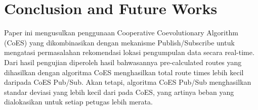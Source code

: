 \documentclass[conference]{IEEEtran}
\begin{document}
\section{Conclusion and Future Works}
\label{sec:conclusion-future-works}
Paper ini mengusulkan penggunaan Cooperative Coevolutionary Algorithm (CoES) yang dikombinasikan dengan mekanisme Publish/Subscribe untuk mengatasi permasalahan rekomendasi lokasi pengumpulan data secara real-time. Dari hasil pengujian diperoleh hasil bahwasannya pre-calculated routes yang dihasilkan dengan algoritma CoES menghasilkan total route times lebih kecil daripada CoES Pub/Sub. Akan tetapi, algoritma CoES Pub/Sub menghasilkan standar deviasi yang lebih kecil dari pada CoES, yang artinya beban yang dialokasikan untuk setiap petugas lebih merata.




%
%

\end{document}
